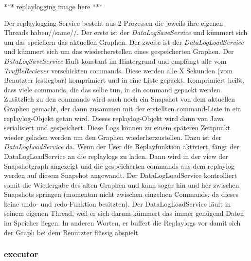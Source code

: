     *** replaylogging image here ***
    \newline
    \newline

    Der replaylogging-Service besteht aus 2 Prozessen die jeweils ihre eigenen Threads haben//same//.
    Der erste ist der \textit{DataLogSaveService} und kümmert sich um das speichern das aktuellen
    Graphen. Der zweite ist der \textit{DataLogLoadService} und kümmert sich um das
    wiederherstellen eines gespeicherten Graphen.
    \newline
    \newline
    Der \textit{DataLogSaveService} läuft konstant im Hintergrund und empfängt alle
    vom \textit{TruffleReciever} verschickten \glspl{command}. Diese werden alle X
    Sekunden (vom Benutzter festlegbar) komprimiert und in eine Liste gepackt.
    Komprimiert heißt, dass viele \glspl{command}, die das selbe tun, in ein \gls{command}
    gepackt werden. Zusätzlich zu den \glspl{command} wird auch noch ein Snapshot
    von dem aktuellen Graphen gemacht, der dann zusammen mit der erstellten
    \gls{command}-Liste in ein \gls{replaylog}-Objekt getan wird. Dieses
    \gls{replaylog}-Objekt wird dann von Java serialisiert und gespeichert.
    \newline
    \newline
    Diese Logs können zu einem späteren Zeitpunkt wieder geladen werden um den
    Graphen wiederherzustellen. Dazu ist der \textit{DataLogLoadService} da. Wenn
    der User die Replayfunktion aktiviert, fängt der DataLogLoadService an die
    \glspl{replaylog} zu laden. Dann wird in der view der Snapshotgraph angezeigt
    und die gespeicherten \glspl{command} aus dem \gls{replaylog} werden auf
    diesem Snapshot angewandt. Der DataLogLoadService kontrolliert somit die
    Wiedergabe des alten Graphen und kann sogar hin und her zwischen Snapshots
    springen (momentan nicht zwischen einzelnen Commands, da dieses keine undo-
    und redo-Funktion besitzten).
    \newline
    \newline
    Der DataLogLoadService läuft in seinem eigenen Thread, weil er sich darum
    kümmert das immer genügend Daten im Speicher liegen. In anderen Worten, er
    buffert die Replaylogs vor damit sich der Graph bei dem Benutzter flüssig
    abspielt.

    \subsubsection{executor}
    \label{subsubsec:executor}

